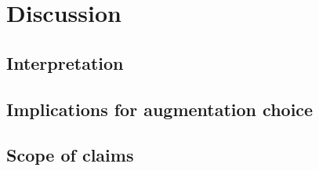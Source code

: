 \documentclass[11pt]{article}
\begin{document}
\section{Discussion}
\label{sec:discussion}
\subsection{Interpretation}
\subsection{Implications for augmentation choice}
\subsection{Scope of claims}
\end{document}
